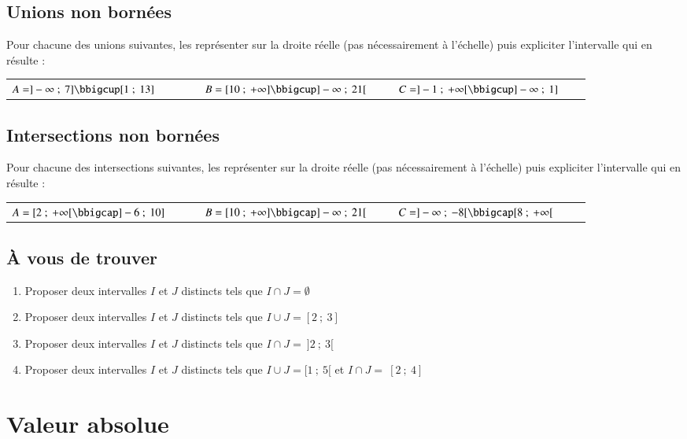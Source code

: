 \documentclass[oneside,12pt]{article}          %
\begin{document}
\subsection{Unions non bornées}
Pour chacune des unions suivantes, les représenter sur la droite réelle (pas nécessairement à l'échelle) puis expliciter l'intervalle qui en résulte :

\begin{tabular}{p{0.3\linewidth} p{0.3\linewidth} p{0.3\linewidth}}
	$A=]-\infty ~;~ 7] \bbigcup [1 ~;~ 13]$ &
	$B=[10 ~;~ +\infty] \bbigcup ]-\infty ~;~ 21[$ &
	$C=]-1 ~;~ +\infty[ \bbigcup ]-\infty ~;~ 1]$
\end{tabular}



\subsection{Intersections non bornées}
Pour chacune des intersections suivantes, les représenter sur la droite réelle (pas nécessairement à l'échelle) puis expliciter l'intervalle qui en résulte :

\begin{tabular}{p{0.3\linewidth} p{0.3\linewidth} p{0.3\linewidth}}
	$A=[2 ~;~ +\infty[ \bbigcap ]-6 ~;~ 10]$ &
	$B=[10 ~;~ +\infty] \bbigcap ]-\infty ~;~ 21[$ &
	$C=]-\infty ~;~ -8[ \bbigcap [8 ~;~ +\infty[$ 
\end{tabular}



\subsection{À vous de trouver}
\begin{enumerate}[itemsep = 5pt]
	\item Proposer deux intervalles $I$ et $J$ distincts tels que $I \cap J = \emptyset$
	\item Proposer deux intervalles $I$ et $J$ distincts tels que $I \cup J = [2 ~;~ 3]$
	\item Proposer deux intervalles $I$ et $J$ distincts tels que $I \cap J = ~]2 ~;~ 3[$
	\item Proposer deux intervalles $I$ et $J$ distincts tels que $I \cup J = [1 ~;~ 5[$ et $I \cap J = ~[2 ~;~ 4]$
\end{enumerate}



\section{Valeur absolue}
\end{document}
